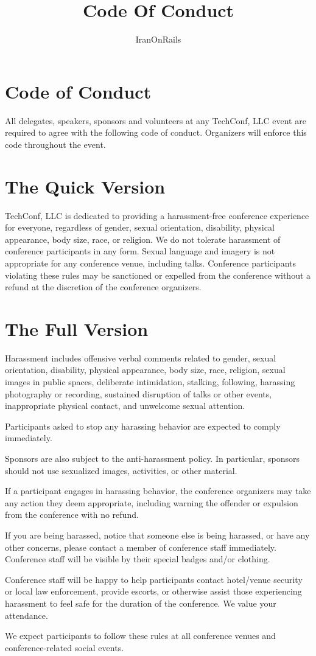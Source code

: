 \documentclass[a4paper,12pt]{report}
\author{IranOnRails}
\title{Code Of Conduct}
\begin{document}
\maketitle
\newpage
\section*{Code of Conduct}
All delegates, speakers, sponsors and volunteers at any TechConf, LLC event are
required to agree with the following code of conduct. Organizers will enforce this
code throughout the event.

\section*{The Quick Version}
TechConf, LLC is dedicated to providing a harassment-free conference experience for
everyone, regardless of gender, sexual orientation, disability, physical appearance,
body size, race, or religion. We do not tolerate harassment of conference participants
in any form. Sexual language and imagery is not appropriate for any conference venue,
including talks. Conference participants violating these rules may be sanctioned or
expelled from the conference without a refund at the discretion of the conference organizers.

\section*{The Full Version}
Harassment includes offensive verbal comments related to gender, sexual orientation,
disability, physical appearance, body size, race, religion, sexual images in public
spaces, deliberate intimidation, stalking, following, harassing photography or recording,
sustained disruption of talks or other events, inappropriate physical contact, and unwelcome
sexual attention.

Participants asked to stop any harassing behavior are expected to comply immediately.

Sponsors are also subject to the anti-harassment policy. In particular, sponsors should not
use sexualized images, activities, or other material.

If a participant engages in harassing behavior, the conference organizers may take any action
they deem appropriate, including warning the offender or expulsion from the conference with no refund.

If you are being harassed, notice that someone else is being harassed, or have any other concerns,
please contact a member of conference staff immediately. Conference staff will be visible by their
special badges and/or clothing.

Conference staff will be happy to help participants contact hotel/venue security or local law
enforcement, provide escorts, or otherwise assist those experiencing harassment to feel safe for
the duration of the conference. We value your attendance.

We expect participants to follow these rules at all conference venues and conference-related social events.
\end{document}
